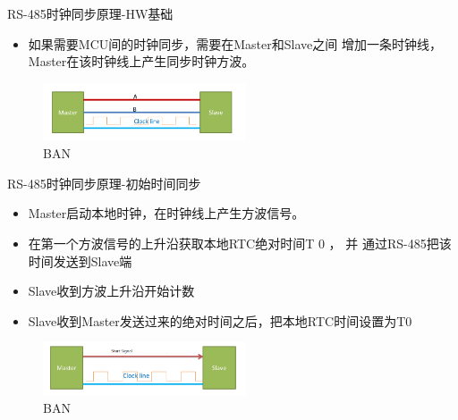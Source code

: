 \begin{frame}[fragile]{RS-485时钟同步原理-HW基础}

\begin{itemize}
  \item 如果需要MCU间的时钟同步，需要在Master和Slave之间
增加一条时钟线，Master在该时钟线上产生同步时钟方波。
\end{itemize}

\begin{figure}[htbp]
\begin{center}
\includegraphics[width=6cm]{img/syncchart}
\caption{BAN }
\label{Overview}
\end{center}
\vspace{-0.5em}
\end{figure}
\end{frame}




\begin{frame}[fragile]{RS-485时钟同步原理-初始时间同步}

\begin{itemize}
  \item Master启动本地时钟，在时钟线上产生方波信号。
\item 在第一个方波信号的上升沿获取本地RTC绝对时间T 0 ， 并
通过RS-485把该时间发送到Slave端
\item Slave收到方波上升沿开始计数
\item Slave收到Master发送过来的绝对时间之后，把本地RTC时间设置为T0
\end{itemize}

\begin{figure}[htbp]
\begin{center}
\includegraphics[width=6cm]{img/abstim}
\caption{BAN }
\label{Overview}
\end{center}
\vspace{-0.5em}
\end{figure}
\end{frame}





